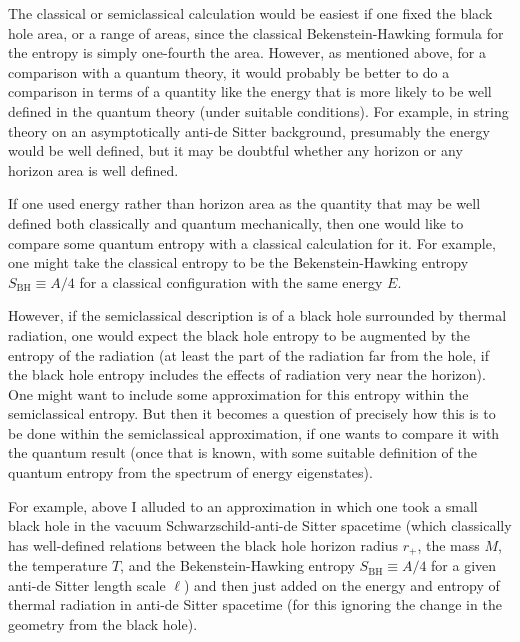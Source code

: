 \documentclass[12pt]{article} \usepackage{latexsym} \textwidth 15cm
\begin{document}
The classical or semiclassical calculation would be easiest if one
fixed the black hole area, or a range of areas, since the classical
Bekenstein-Hawking formula for the entropy is simply one-fourth the
area.  However, as mentioned above, for a comparison with a quantum
theory, it would probably be better to do a comparison in terms of a
quantity like the energy that is more likely to be well defined in the
quantum theory (under suitable conditions).  For example, in string
theory on an asymptotically anti-de Sitter background, presumably the
energy would be well defined, but it may be doubtful whether any
horizon or any horizon area is well defined.

If one used energy rather than horizon area as the quantity that may be
well defined both classically and quantum mechanically, then one would
like to compare some quantum entropy with a classical calculation for
it.  For example, one might take the classical entropy to be the
Bekenstein-Hawking entropy $S_{\mathrm{BH}} \equiv A/4$ for a classical
configuration with the same energy $E$.

However, if the semiclassical description is of a black hole surrounded
by thermal radiation, one would expect the black hole entropy to be
augmented by the entropy of the radiation (at least the part of the
radiation far from the hole, if the black hole entropy includes the
effects of radiation very near the horizon).  One might want to include
some approximation for this entropy within the semiclassical entropy. 
But then it becomes a question of precisely how this is to be done
within the semiclassical approximation, if one wants to compare it with
the quantum result (once that is known, with some suitable definition of
the quantum entropy from the spectrum of energy eigenstates).

For example, above I alluded to an approximation in which one took a
small black hole in the vacuum Schwarzschild-anti-de Sitter spacetime
(which classically has well-defined relations between the black hole 
horizon radius $r_+$, the mass $M$, the temperature $T$, and the
Bekenstein-Hawking entropy $S_{\mathrm{BH}} \equiv A/4$ for a given
anti-de Sitter length scale $\ell$) and then just added on the energy
and entropy of thermal radiation in anti-de Sitter spacetime (for this
ignoring the change in the geometry from the black hole).
\end{document}
